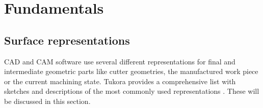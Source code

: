 \chapter{Fundamentals} %
\label{ch:fundamentals}

\section{Surface representations}
\label{sec:surface_representations}

CAD and CAM software use several different representations for final and intermediate geometric parts like cutter geometries, the manufactured work piece or the current machining state.
Tukora provides a comprehensive list with sketches and descriptions of the most commonly used representations \cite{virtual_machining_review}. These will be discussed in this section. 


